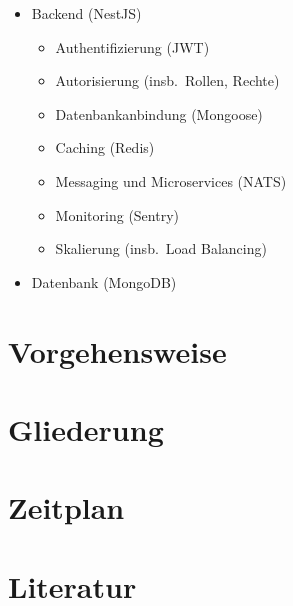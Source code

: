 \begin{itemize}
\begin{itemize}
    \end{itemize}
    \item Backend (NestJS)
    \begin{itemize}
        \item Authentifizierung (JWT)
        \item Autorisierung (insb.\ Rollen, Rechte)
        \item Datenbankanbindung (Mongoose)
        \item Caching (Redis)
        \item Messaging und Microservices (NATS)
        \item Monitoring (Sentry)
        \item Skalierung (insb.\ Load Balancing)
    \end{itemize}
    \item Datenbank (MongoDB)
\end{itemize}

\section{Vorgehensweise}\label{sec:vorgehensweise}

\section{Gliederung}\label{sec:gliederung}

\section{Zeitplan}\label{sec:zeitplan}

\section{Literatur}\label{sec:literatur}
